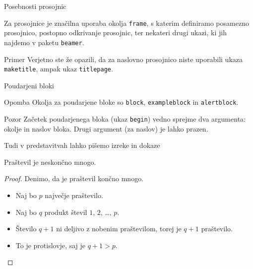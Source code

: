 \begin{frame}{Posebnosti prosojnic}

	Za prosojnice je značilna uporaba okolja \texttt{frame},
	s katerim definiramo posamezno prosojnico,
	\pause
	postopno odkrivanje prosojnic,
	\pause
	ter nekateri drugi ukazi, ki jih najdemo v paketu \texttt{beamer}.
	\pause
	\begin{exampleblock}{Primer}
		Verjetno ste že opazili, da za naslovno prosojnico niste uporabili
		ukaza \texttt{maketitle}, ampak ukaz \texttt{titlepage}.
	\end{exampleblock}
\end{frame}

\begin{frame}{Poudarjeni bloki}

		
		\begin{exampleblock}{Opomba}
			Okolja za poudarjene bloke so \texttt{block}, \texttt{exampleblock} in \texttt{alertblock}.
	
		\end{exampleblock}
		
		\begin{alertblock}{Pozor}
			Začetek poudarjenega bloka (ukaz \texttt{begin}) vedno sprejme 
			dva argumenta: okolje in naslov bloka.
			Drugi argument (za naslov) je lahko prazen. 
		\end{alertblock}

\end{frame}

\begin{frame}{Tudi v predstavitvah lahko pišemo izreke in dokaze}

	\begin{izrek}
	   Praštevil je neskončno mnogo.
	\end{izrek}
	\begin{proof}
	   Denimo, da je praštevil končno mnogo.
	   \begin{itemize}[<+->]
		  \item Naj bo \(p\) \alert{največje} praštevilo.
		  \item Naj bo \(q\) produkt števil \(1\), \(2\), \ldots, \(p\).
		  \item Število \(q+1\) ni deljivo z nobenim praštevilom, torej je \(q+1\) praštevilo.
		  \item To je protislovje, saj je \(q+1>p\). \qedhere
	   \end{itemize}
	\end{proof}
 \end{frame}
 
